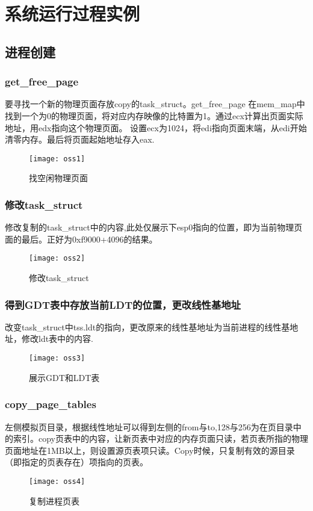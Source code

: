 \documentclass[]{report}
\begin{document}
\chapter{系统运行过程实例}

\section{进程创建}
\subsection{get\_free\_page}
要寻找一个新的物理页面存放copy的task\_struct。get\_free\_page
在mem\_map中找到一个为0的物理页面，将对应内存映像的比特置为1。通过ecx计算出页面实际地址，用edx指向这个物理页面。 设置ecx为1024，将edi指向页面末端，从edi开始清零内存。最后将页面起始地址存入eax.   

\begin{figure}[H]%
	\centering  %
	\texttt{[image: oss1]}  
	\caption{找空闲物理页面}  %
	\label{fig19}
\end{figure}

\subsection{修改task\_struct}
修改复制的task\_struct中的内容,此处仅展示下esp0指向的位置，即为当前物理页面的最后。正好为0xf9000+4096的结果。
\begin{figure}[H]%
	\centering  %
	\texttt{[image: oss2]}  
	\caption{修改task\_struct}  %
	\label{fig20}
\end{figure}
\subsection{得到GDT表中存放当前LDT的位置，更改线性基地址}
改变task\_struct中tss.ldt的指向，更改原来的线性基地址为当前进程的线性基地址，修改ldt表中的内容.
\begin{figure}[H]%
	\centering  %
	\texttt{[image: oss3]}  
	\caption{展示GDT和LDT表}  %
	\label{fig21}
\end{figure}
\subsection{copy\_page\_tables}
左侧模拟页目录，根据线性地址可以得到左侧的from与to,128与256为在页目录中的索引。copy页表中的内容，让新页表中对应的内存页面只读，若页表所指的物理页面地址在1MB以上，则设置源页表项只读。Copy时候，只复制有效的源目录（即指定的页表存在）项指向的页表。
\begin{figure}[H]%
	\centering  %
	\texttt{[image: oss4]}  
	\caption{复制进程页表}  %
	\label{fig22}
\end{figure}
\end{document}
